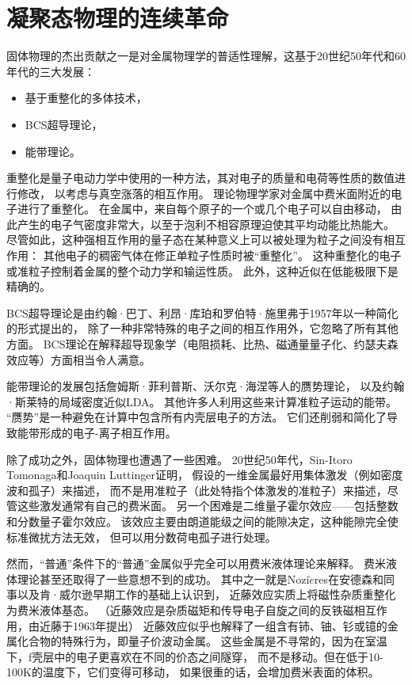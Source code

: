 \documentclass{article}
\begin{document}
\section{凝聚态物理的连续革命}

固体物理的杰出贡献之一是对金属物理学的普适性理解，这基于20世纪50年代和60年代的三大发展：
\begin{itemize}
    \item 基于重整化的多体技术，
    \item BCS超导理论，
    \item 能带理论。
\end{itemize}

重整化是量子电动力学中使用的一种方法，其对电子的质量和电荷等性质的数值进行修改，
以考虑与真空涨落的相互作用。
理论物理学家对金属中费米面附近的电子进行了重整化。
在金属中，来自每个原子的一个或几个电子可以自由移动，
由此产生的电子气密度非常大，以至于泡利不相容原理迫使其平均动能比热能大。
尽管如此，这种强相互作用的量子态在某种意义上可以被处理为粒子之间没有相互作用：
其他电子的稠密气体在修正单粒子性质时被“重整化”。
这种重整化的电子或准粒子控制着金属的整个动力学和输运性质。
此外，这种近似在低能极限下是精确的。

BCS超导理论是由约翰·巴丁、利昂·库珀和罗伯特·施里弗于1957年以一种简化的形式提出的，
除了一种非常特殊的电子之间的相互作用外，它忽略了所有其他方面。
BCS理论在解释超导现象学（电阻损耗、比热、磁通量量子化、约瑟夫森效应等）方面相当令人满意。

能带理论的发展包括詹姆斯·菲利普斯、沃尔克·海涅等人的赝势理论，
以及约翰·斯莱特的局域密度近似LDA。
其他许多人利用这些来计算准粒子运动的能带。
“赝势”是一种避免在计算中包含所有内壳层电子的方法。
它们还削弱和简化了导致能带形成的电子-离子相互作用。 

除了成功之外，固体物理也遭遇了一些困难。
20世纪50年代，Sin-Itoro Tomonaga和Joaquin Luttinger证明，
假设的一维金属最好用集体激发（例如密度波和孤子）来描述，
而不是用准粒子（此处特指个体激发的准粒子）来描述，尽管这些激发通常有自己的费米面。
另一个困难是二维量子霍尔效应——包括整数和分数量子霍尔效应。
该效应主要由朗道能级之间的能隙决定，这种能隙完全使标准微扰方法无效，
但可以用分数荷电孤子进行处理。

然而，“普通”条件下的“普通”金属似乎完全可以用费米液体理论来解释。
费米液体理论甚至还取得了一些意想不到的成功。
其中之一就是Nozi$\grave{e}$res在安德森和同事以及肯·威尔逊早期工作的基础上认识到，
近藤效应实质上将磁性杂质重整化为费米液体基态。
（近藤效应是杂质磁矩和传导电子自旋之间的反铁磁相互作用，由近藤于1963年提出）
近藤效应似乎也解释了一组含有铈、铀、钐或镱的金属化合物的特殊行为，即量子价波动金属。
这些金属是不寻常的，因为在室温下，f壳层中的电子更喜欢在不同的价态之间隧穿，
而不是移动。但在低于10-100K的温度下，它们变得可移动，
如果很重的话，会增加费米表面的体积。
\end{document}
